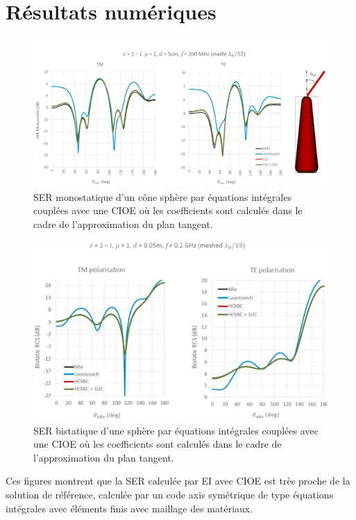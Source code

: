 \section{Résultats numériques}

  \begin{figure}[!hbt]
    \centering
    \includegraphics[width=\textwidth]{images/ser/cone_sphere_mono.png}
    \caption{SER monostatique d'un cône sphère par équations intégrales couplées avec une CIOE où les coefficients sont calculés dans le cadre de l'approximation du plan tangent.}
    \label{fig:ser:cone-sphere-mono-M1}
  \end{figure}


  \begin{figure}[!hbt]
    \centering
    \includegraphics[width=\textwidth]{images/ser/sphere_bis.png}
    \caption{SER bistatique d'une sphère par équations intégrales couplées avec une CIOE où les coefficients sont calculés dans le cadre de l'approximation du plan tangent.}
    \label{fig:ser:sphere-bis-M1}
  \end{figure}

  Ces figures montrent que la SER calculée par EI avec CIOE est très proche de la solution de référence, calculée par un code axis symétrique de type équations intégrales avec éléments finis avec maillage des matériaux.
